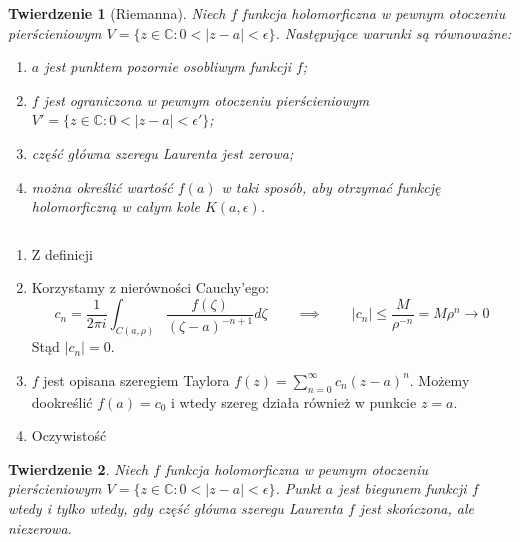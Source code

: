 \documentclass[11pt]{article}
\newcommand{\abs}[1]{\left|#1\right|} %
\theoremstyle{plain}
\newtheorem*{theorem}{Twierdzenie}
\theoremstyle{definition}
\theoremstyle{remark}
\let\oldendproof\endproof
\renewenvironment{proof}[1][\proofname]{
  \oldproof[\textsc{\small #1}]
}{\oldendproof}
\begin{document}
\begin{theorem}[Riemanna]
  Niech $f$ funkcja holomorficzna w pewnym otoczeniu pierścieniowym $ V = \{ z \in \mathbb{C}: 0 < \abs{z-a} < \epsilon \} $.
  Następujące warunki są równoważne:

  \begin{enumerate}
    \item $ a $ jest punktem pozornie osobliwym funkcji $ f $; \label{tw-riemanna-poz}
    \item $ f $ jest ograniczona w pewnym otoczeniu pierścieniowym  $ V' = \{ z \in \mathbb{C}: 0 < \abs{z-a} < \epsilon' \} $; \label{tw-riemanna-ogr}
    \item część główna szeregu Laurenta jest zerowa; \label{tw-riemanna-gl-zerowa}
    \item można określić wartość $ f(a) $ w taki sposób, aby otrzymać funkcję holomorficzną w całym kole $ K(a, \epsilon) $. \label{tw-riemanna-dookreslenie}
  \end{enumerate}
\end{theorem}

\begin{proof}
  $ $
  \begin{enumerate}[leftmargin=5.1em]
    \item[\ref{tw-riemanna-poz} $ \Rightarrow $ \ref{tw-riemanna-ogr}]
    Z definicji

    \item[\ref{tw-riemanna-ogr} $ \Rightarrow $ \ref{tw-riemanna-gl-zerowa}]
    Korzystamy z nierówności Cauchy’ego:
    $$
      c_{n} =  \frac{1}{2 \pi i} \int_{C(a, \rho)} \frac{f(\zeta)}{(\zeta-a)^{-n+1}} d\zeta
      \qquad\implies\qquad
      \abs{ c_n } \leq \frac{M}{\rho^{-n}} = M\rho^n \to 0
    $$
    Stąd $ \abs{c_n} = 0 $.

    \item[\ref{tw-riemanna-gl-zerowa} $ \Rightarrow $ \ref{tw-riemanna-dookreslenie}]
    $ f $ jest opisana szeregiem Taylora $ f(z) = \sum_{n=0}^{\infty} c_n(z-a)^n $.
    Możemy dookreślić $ f(a) = c_0 $ i wtedy szereg działa również w punkcie $ z = a $.

    \item[\ref{tw-riemanna-dookreslenie} $ \Rightarrow $ \ref{tw-riemanna-poz}]
    Oczywistość
  \end{enumerate}
\end{proof}

\begin{theorem}
  Niech $f$ funkcja holomorficzna w pewnym otoczeniu pierścieniowym $ V = \{ z \in \mathbb{C}: 0 < \abs{z-a} < \epsilon \} $.
  Punkt $a$ jest biegunem funkcji $f$ wtedy i tylko wtedy,
  gdy część główna szeregu Laurenta $ f $ jest skończona, ale niezerowa.
\end{theorem}
\end{document}
